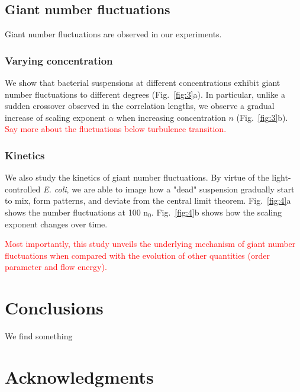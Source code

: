 \documentclass[twocolumn,aps,pre,amsmath,amssymb,floatfix,longbibliography]{revtex4-1}
\begin{document}
\subsection{Giant number fluctuations}
Giant number fluctuations are observed in our experiments.

\subsubsection{Varying concentration}
 We show that bacterial suspensions at different concentrations exhibit giant number fluctuations to different degrees (Fig.~\ref{fig:3}a). In particular, unlike a sudden crossover observed in the correlation lengths, we observe a gradual increase of scaling exponent $\alpha$ when increasing concentration $n$ (Fig.~\ref{fig:3}b). \textcolor{red}{Say more about the fluctuations below turbulence transition.}

\subsubsection{Kinetics}
We also study the kinetics of giant number fluctuations. By virtue of the light-controlled \textit{E. coli}, we are able to image how a "dead" suspension gradually start to mix, form patterns, and deviate from the central limit theorem. Fig.~\ref{fig:4}a shows the number fluctuations at 100 n$_0$. Fig.~\ref{fig:4}b shows how the scaling exponent changes over time.

\textcolor{red}{Most importantly, this study unveils the underlying mechanism of giant number fluctuations when compared with the evolution of other quantities (order parameter and flow energy).}
\section{Conclusions}
We find something

\section*{Acknowledgments}


%

\end{document}
